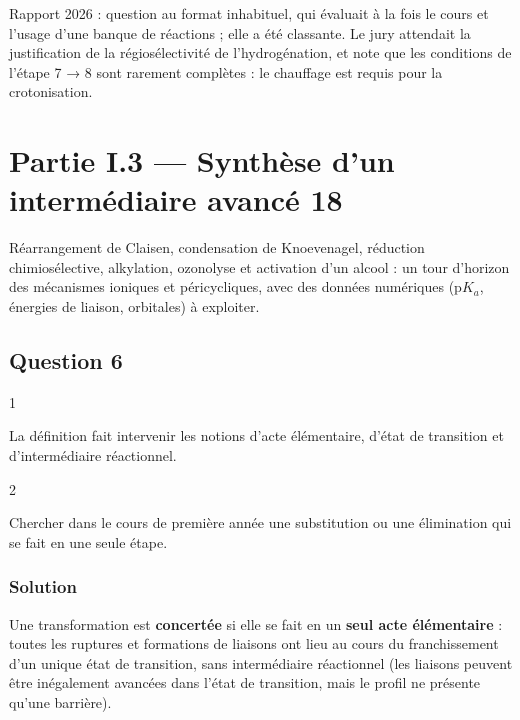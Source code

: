 \documentclass[11pt,a4paper]{article}
\begin{document}
\begin{jury}

Rapport 2026 : question au format inhabituel, qui évaluait à la fois le cours et l'usage d'une banque de réactions ; elle a été classante. Le jury attendait la justification de la régiosélectivité de l'hydrogénation, et note que les conditions de l'étape 7 → 8 sont rarement complètes : le chauffage est requis pour la crotonisation.

\end{jury}

\hypertarget{partie-i.3-synthuxe8se-dun-intermuxe9diaire-avancuxe9-18}{%
\section{Partie I.3 --- Synthèse d'un intermédiaire avancé 18}\label{partie-i.3-synthuxe8se-dun-intermuxe9diaire-avancuxe9-18}}

Réarrangement de Claisen, condensation de Knoevenagel, réduction chimiosélective, alkylation, ozonolyse et activation d'un alcool : un tour d'horizon des mécanismes ioniques et péricycliques, avec des données numériques (p\(K_a\), énergies de liaison, orbitales) à exploiter.

\hypertarget{question-6}{%
\subsection{Question 6}\label{question-6}}

\begin{indication}{1}

La définition fait intervenir les notions d'acte élémentaire, d'état de transition et d'intermédiaire réactionnel.

\end{indication}

\begin{indication}{2}

Chercher dans le cours de première année une substitution ou une élimination qui se fait en une seule étape.

\end{indication}

\hypertarget{solution-5}{%
\subsubsection{Solution}\label{solution-5}}

Une transformation est \textbf{concertée} si elle se fait en un \textbf{seul acte élémentaire} : toutes les ruptures et formations de liaisons ont lieu au cours du franchissement d'un unique état de transition, sans intermédiaire réactionnel (les liaisons peuvent être inégalement avancées dans l'état de transition, mais le profil ne présente qu'une barrière).
\end{document}
